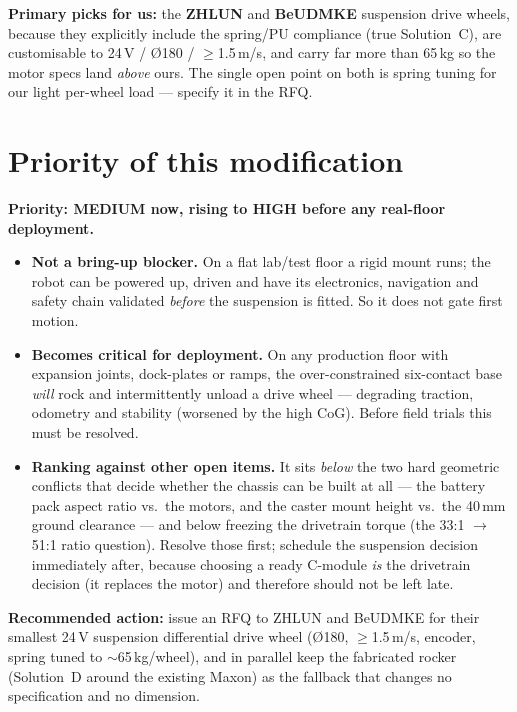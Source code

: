 \documentclass[11pt,a4paper]{article}
\newcommand{\prio}[1]{\colorbox{amber}{\parbox{\dimexpr\linewidth-2\fboxsep}{#1}}}
\begin{document}
\noindent\textbf{Primary picks for us:} the \textbf{ZHLUN} and \textbf{BeUDMKE} suspension drive wheels,
because they explicitly include the spring/PU compliance (true Solution~C), are customisable to 24\,V /
\O180 / $\geq$1.5\,m/s, and carry far more than 65\,kg so the motor specs land \emph{above} ours. The
single open point on both is spring tuning for our light per-wheel load --- specify it in the RFQ.

\section{Priority of this modification}
\prio{\textbf{Priority: MEDIUM now, rising to HIGH before any real-floor deployment.}}

\begin{itemize}
\item \textbf{Not a bring-up blocker.} On a flat lab/test floor a rigid mount runs; the robot can be
powered up, driven and have its electronics, navigation and safety chain validated \emph{before} the
suspension is fitted. So it does not gate first motion.
\item \textbf{Becomes critical for deployment.} On any production floor with expansion joints,
dock-plates or ramps, the over-constrained six-contact base \emph{will} rock and intermittently unload a
drive wheel --- degrading traction, odometry and stability (worsened by the high CoG). Before field
trials this must be resolved.
\item \textbf{Ranking against other open items.} It sits \emph{below} the two hard geometric conflicts
that decide whether the chassis can be built at all --- the battery pack aspect ratio vs.\ the motors,
and the caster mount height vs.\ the 40\,mm ground clearance --- and below freezing the drivetrain
torque (the 33:1 $\rightarrow$ 51:1 ratio question). Resolve those first; schedule the suspension
decision immediately after, because choosing a ready C-module \emph{is} the drivetrain decision (it
replaces the motor) and therefore should not be left late.
\end{itemize}

\noindent\textbf{Recommended action:} issue an RFQ to ZHLUN and BeUDMKE for their smallest 24\,V
suspension differential drive wheel (\O180, $\geq$1.5\,m/s, encoder, spring tuned to $\sim$65\,kg/wheel),
and in parallel keep the fabricated rocker (Solution~D around the existing Maxon) as the fallback that
changes no specification and no dimension.
\end{document}
